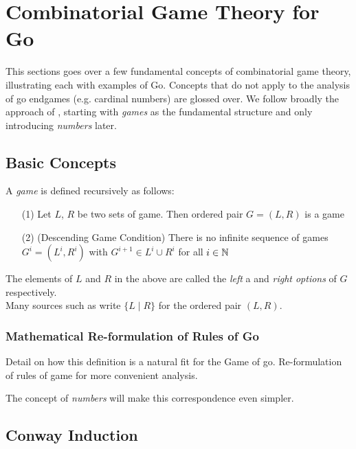 \documentclass[../math194_paper.tex]{subfiles}
\begin{document}
\section{Combinatorial Game Theory for Go}

This sections goes over a few fundamental concepts of combinatorial game 
theory, illustrating each with examples of Go. Concepts that do not apply 
to the analysis of go endgames (e.g. cardinal numbers) are glossed over.
We follow broadly the approach of \cite{schleicher2006introduction}, starting 
with \textit{games} as the fundamental structure and only introducing 
\textit{numbers} later.

\subsection{Basic Concepts}

\begin{definition}[Game] 
    A \textit{game} is defined recursively as follows:
    \begin{itemize}
        \item[(1)] Let $L$, $R$ be two sets of game. Then ordered pair $G = (L, R)$ is a 
        game  
        \item[(2)] (Descending Game Condition) There is no infinite sequence of games  
        $G^i = (L^i, R^i)$ with $G^{i+1} \in L^i \cup R^i$ for all $i \in \mathbb{N}$
    \end{itemize}
\end{definition}
The elements of $L$ and $R$ in the above are called the \textit{left} a and \textit{right options}
of $G$ respectively. \\
Many sources such as \cite{berlekamp1994mathematical} write $\{L \mid R\}$ for the ordered pair 
$(L,R)$. 

\subsubsection{Mathematical Re-formulation of Rules of Go}
Detail on how this definition is a natural fit for the Game of go. 
Re-formulation of rules of game for more convenient analysis.

The concept of \textit{numbers} will make this correspondence even simpler.


\subsection{Conway Induction}
\end{document}
